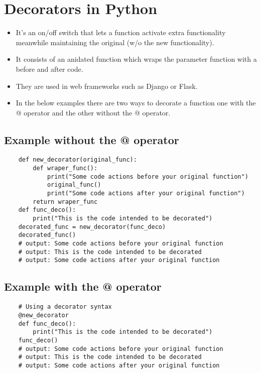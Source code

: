 \section{Decorators in Python}
\begin{itemize}
    \item It's an on/off switch that lets a function activate extra functionality meanwhile maintaining the original (w/o the new functionality). 
    \item It consists of an anidated function which wraps the parameter function with a before and after code.
    \item They are used in web frameworks such as Django or Flask.
    \item In the below examples there are two ways to decorate a function one with the @ operator and the other without the @ operator. 
\end{itemize}

\subsection{Example without the @ operator}
\begin{verbatim}
    def new_decorator(original_func):
        def wraper_func():
            print("Some code actions before your original function")
            original_func()
            print("Some code actions after your original function")
        return wraper_func
    def func_deco():
        print("This is the code intended to be decorated")
    decorated_func = new_decorator(func_deco)
    decorated_func()
    # output: Some code actions before your original function
    # output: This is the code intended to be decorated
    # output: Some code actions after your original function
\end{verbatim}

\subsection{Example with the @ operator}
\begin{verbatim}
    # Using a decorator syntax
    @new_decorator
    def func_deco():
        print("This is the code intended to be decorated")
    func_deco()
    # output: Some code actions before your original function
    # output: This is the code intended to be decorated
    # output: Some code actions after your original function
\end{verbatim}
